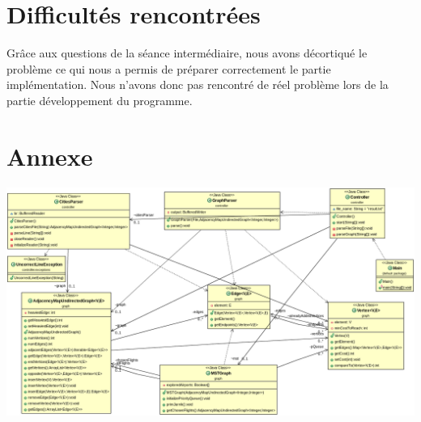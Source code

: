 \documentclass[11pt]{article}
\begin{document}
\section{Difficultés rencontrées}
Grâce aux questions de la séance intermédiaire, nous avons décortiqué le problème ce qui nous a permis de préparer correctement le partie implémentation. Nous n'avons donc pas rencontré de réel problème lors de la partie développement du programme.
\newpage

\section{Annexe}
\begin{center}
\includegraphics[width=19.5cm, angle=90]{A.png}
\end{center}
\end{document}
